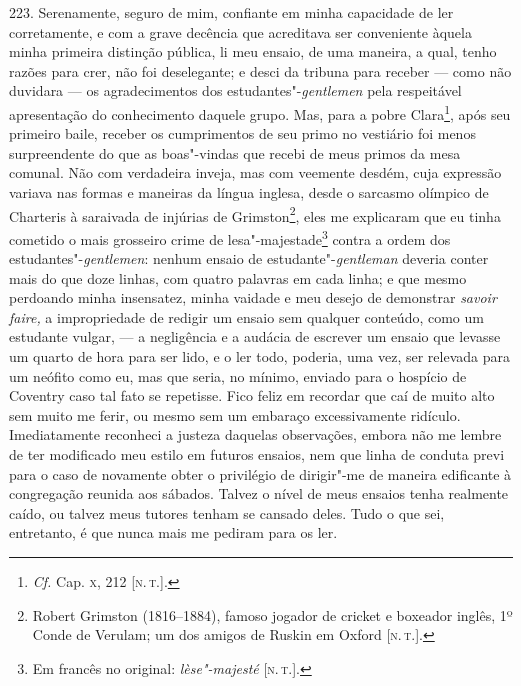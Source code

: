 223. Serenamente, seguro de mim, confiante em minha capacidade de ler
corretamente, e com a grave decência que acreditava ser conveniente
àquela minha primeira distinção pública, li meu ensaio, de uma maneira,
a qual, tenho razões para crer, não foi deselegante; e desci da tribuna
para receber --- como não duvidara --- os agradecimentos dos
estudantes"-\emph{gentlemen} pela respeitável apresentação do
conhecimento daquele grupo. Mas, para a pobre Clara\footnote{\emph{Cf.}
  Cap. \textsc{x}, 212 {[}\textsc{n.\,t.}{]}.}, após seu primeiro baile, receber os
cumprimentos de seu primo no vestiário foi menos surpreendente do que as
boas"-vindas que recebi de meus primos da mesa comunal. Não com
verdadeira inveja, mas com veemente desdém, cuja expressão variava nas
formas e maneiras da língua inglesa, desde o sarcasmo olímpico de
Charteris à saraivada de injúrias de Grimston\footnote{Robert Grimston
  (1816--1884), famoso jogador de cricket e boxeador inglês, 1º Conde de
  Verulam; um dos amigos de Ruskin em Oxford {[}\textsc{n.\,t.}{]}.}, eles me
explicaram que eu tinha cometido o mais grosseiro crime de
lesa"-majestade\footnote{Em francês no original: \emph{lèse"-majesté}
  {[}\textsc{n.\,t.}{]}.} contra a ordem dos estudantes"-\emph{gentlemen}:
nenhum ensaio de estudante"-\emph{gentleman} deveria conter mais do que
doze linhas, com quatro palavras em cada linha; e que mesmo perdoando
minha insensatez, minha vaidade e meu desejo de demonstrar \emph{savoir
faire,} a impropriedade de redigir um ensaio sem qualquer conteúdo, como
um estudante vulgar, --- a negligência e a audácia de escrever um ensaio
que levasse um quarto de hora para ser lido, e o ler todo, poderia, uma
vez, ser relevada para um neófito como eu, mas que seria, no mínimo,
enviado para o hospício de Coventry caso tal fato se repetisse. Fico
feliz em recordar que caí de muito alto sem muito me ferir, ou mesmo sem
um embaraço excessivamente ridículo. Imediatamente reconheci a justeza
daquelas observações, embora não me lembre de ter modificado meu estilo
em futuros ensaios, nem que linha de conduta previ para o caso de
novamente obter o privilégio de dirigir"-me de maneira edificante à
congregação reunida aos sábados. Talvez o nível de meus ensaios tenha
realmente caído, ou talvez meus tutores tenham se cansado deles. Tudo o
que sei, entretanto, é que nunca mais me pediram para os ler.

